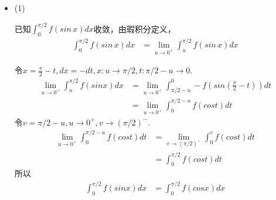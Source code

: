 \documentclass{article}
\begin{document}
\begin{itemize}
  \item (1)

        已知$\int_{0}^{\pi/2} f(sin \, x) dx$收敛，由瑕积分定义，
        \begin{align*}
          \int_{0}^{\pi/2} f(sin \, x) dx
           & = \lim \limits_{u \to 0^+} \int_{u}^{\pi/2} f(sin \, x) dx
        \end{align*}

        令$x = \frac{\pi}{2} - t, dx = -dt, x: u \to \pi/2, t: \pi/2 - u \to 0$.
        \begin{align*}
          \lim\limits_{u \to 0^+} \int_{u}^{\pi/2} f (sin x) dx
           & = \lim\limits_{u \to 0^+} \int_{\pi/2 - u}^{0} - f (sin(\frac{\pi}{2} - t)) dt \\
           & = \lim\limits_{u \to 0^+} \int_{0}^{\pi/2 - u} f (cost) dt
        \end{align*}
        令$v = \pi/2 - u, u \to 0^+, v \to (\pi/2)^-$.
        \begin{align*}
          \lim\limits_{u \to 0^+} \int_{0}^{\pi/2 - u} f (cost) dt
           & = \lim\limits_{v \to (\pi/2)^-} \int_{0}^{v} f (cost) dt \\
           & = \int_{0}^{\pi/2} f (cost) dt
        \end{align*}
        所以
        \begin{align*}
          \int_{0}^{\pi/2} f (sin x) dx
           & = \int_{0}^{\pi/2} f (cos x) dx
        \end{align*}



\end{itemize}
\end{document}
